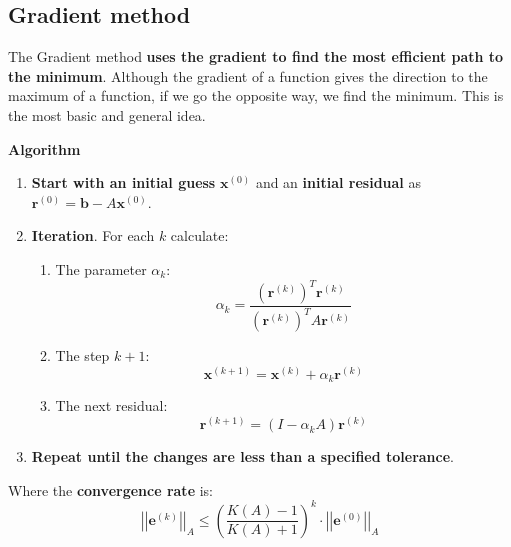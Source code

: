 \subsection{Gradient method}

The Gradient method \textbf{uses the gradient to find the most efficient path to the minimum}. Although the gradient of a function gives the direction to the maximum of a function, if we go the opposite way, we find the minimum. This is the most basic and general idea.

\begin{flushleft}
    \textcolor{Green3}{ \textbf{Algorithm}}
\end{flushleft}
\begin{enumerate}
    \item \textbf{Start with an initial guess} $\mathbf{x}^{\left(0\right)}$ and an \textbf{initial residual} as $\mathbf{r}^{\left(0\right)} = \mathbf{b} - A\mathbf{x}^{\left(0\right)}$.
    \item \textbf{Iteration}. For each $k$ calculate:
    \begin{enumerate}
        \item The parameter $\alpha_{k}$:
        \begin{equation}
            \alpha_{k} = \dfrac{
                \left(\mathbf{r}^{\left(k\right)}\right)^{T}\mathbf{r}^{\left(k\right)}
            }{
                \left(\mathbf{r}^{\left(k\right)}\right)^{T}A\mathbf{r}^{\left(k\right)}
            }
        \end{equation}

        \item The step $k+1$:
        \begin{equation}
            \mathbf{x}^{\left(k+1\right)} = \mathbf{x}^{\left(k\right)} + \alpha_{k}\mathbf{r}^{\left(k\right)}
        \end{equation}

        \item The next residual:
        \begin{equation}
            \mathbf{r}^{\left(k+1\right)} = \left(I-\alpha_{k}A\right)\mathbf{r}^{\left(k\right)}
        \end{equation}
    \end{enumerate}
    \item \textbf{Repeat until the changes are less than a specified tolerance}.
\end{enumerate}
Where the \textbf{convergence rate} is:
\begin{equation}
    {\left|\left|\mathbf{e}^{\left(k\right)}\right|\right|}_{A} \le \left(\dfrac{K\left(A\right)-1}{K\left(A\right)+1}\right)^{k} \cdot {\left|\left|\mathbf{e}^{\left(0\right)}\right|\right|}_{A}
\end{equation}

